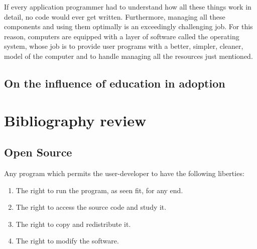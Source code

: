 \documentclass[
12pt,				%
openright,			%
oneside,			%
a4paper,			%
brazil,				%
english,			%
]{abntex2}
\begin{document}
\begin{citacao}
If every application programmer had to understand how all these things work in detail, no code would ever
get written. Furthermore, managing all these components and using them optimally
is an exceedingly challenging job. For this reason, computers are equipped with a
layer of software called the operating system, whose job is to provide
user programs with a better, simpler, cleaner, model of the computer
and to handle managing all the resources just mentioned. \cite{tanenbaum2015modern}
\end{citacao}




\section{On the influence of education in adoption}





\chapter{Bibliography review}
\section{Open Source}
\label{sec:opensource}

Any program which permits the user-developer to have the following liberties:
\begin{enumerate}
\item The right to run the program, as seen fit, for any end.
\item The right to access the source code and study it.
\item The right to copy and redistribute it.
\item The right to modify the software.
\end{enumerate}
\end{document}
